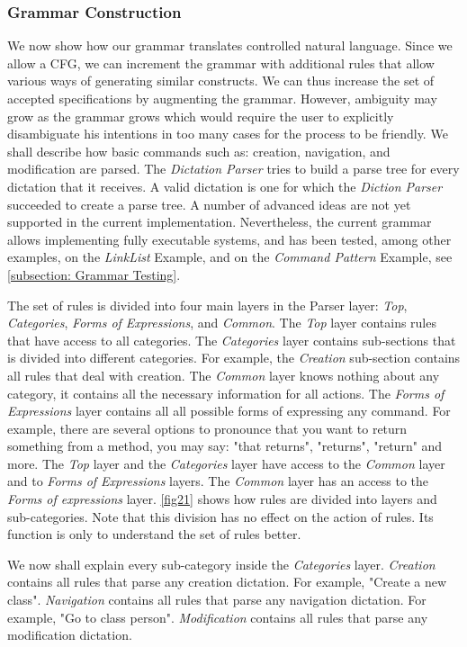 \subsubsection{Grammar Construction}
We now show how our grammar translates controlled natural language. Since we allow a CFG, we can increment the grammar with additional rules that allow various ways of generating similar constructs. We can thus increase the set of accepted specifications by augmenting the grammar. However, ambiguity may grow as the grammar grows which would require the user to explicitly disambiguate his intentions in too many cases for the process to be friendly. We shall describe how basic commands such as: creation, navigation, and modification are parsed. The \textit{Dictation Parser} tries to build a parse tree for every dictation that it receives. A valid dictation is one for which the \textit{Diction Parser} succeeded to create a parse tree. A number of advanced ideas are not yet supported in the current implementation. Nevertheless, the current grammar allows implementing fully executable systems, and has been tested, among other examples, on the \textit{LinkList} Example, and on the \textit{Command Pattern} Example, see \ref{subsection: Grammar Testing}.

The set of rules is divided into four main layers in the Parser layer: \textit{Top}, \textit{Categories}, \textit{Forms of Expressions}, and \textit{Common}. The \textit{Top} layer contains rules that have access to all categories. The \textit{Categories} layer contains sub-sections that is divided into different categories. For example, the \textit{Creation} sub-section contains all rules that deal with creation. The \textit{Common} layer knows nothing about any category, it contains all the necessary information for all actions. The \textit{Forms of Expressions} layer contains all all possible forms of expressing any command. For example, there are several options to pronounce that you want to return something from a method, you may say: "that returns", "returns", "return" and more. The \textit{Top} layer and the \textit{Categories} layer have access to the \textit{Common} layer and to \textit{Forms of Expressions} layers. The \textit{Common} layer has an access to the \textit{Forms of expressions} layer. \autoref{fig21} shows how rules are divided into layers and sub-categories. Note that this division has no effect on the action of rules. Its function is only to understand the set of rules better.

We now shall explain every sub-category inside the \textit{Categories} layer. \textit{Creation} contains all rules that parse any creation dictation. For example, "Create a new class". \textit{Navigation} contains all rules that parse any navigation dictation. For example, "Go to class person". \textit{Modification} contains all rules that parse any modification dictation.

